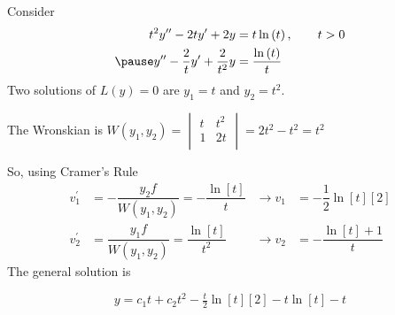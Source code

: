 \documentclass{beamer}
\begin{document}
\begin{frame}
\begin{example}
Consider
\begin{equation*}
\begin{aligned}
t^2 y^{\prime\prime}-2t y^\prime+2y&=t\ln[t]
,\qquad t>0\\\pause
y^{\prime\prime}-\dfrac{2}{t}y^\prime+\dfrac{2}{t^2}y&=\dfrac{\ln[t]}{t}
\end{aligned}
\end{equation*}\pause
Two solutions of $L(y)=0$ are $y_1=t$ and $y_2=t^2$.\pause

\vspace{2mm}
The Wronskian is $W(y_1,y_2)=
\begin{vmatrix}
t & t^2 \\
1 & 2t  \\
\end{vmatrix}
=2t^2-t^2=t^2$\pause

\vspace{2mm}
So, using Cramer's Rule
\begin{equation*}
\begin{aligned}
v_1^\prime &= -\dfrac{y_2 f}{W(y_1, y_2)}=-\dfrac{\ln[t]}{t} 
&\rightarrow v_1 &= -\dfrac{1}{2}\ln[t][2]\\
v_2^\prime &= \dfrac{y_1 f}{W(y_1, y_2)}=\dfrac{\ln[t]}{t^2}
&\rightarrow v_2 &= -\dfrac{\ln[t]+1}{t}
\end{aligned}
\end{equation*}\pause
The general solution is

\vspace{-3mm}
\begin{equation*}
y=c_1t+c_2t^2-\tfrac{t}{2}\ln[t][2]-t\ln[t]-t
\end{equation*}
\end{example}
\end{frame}
\end{document}
